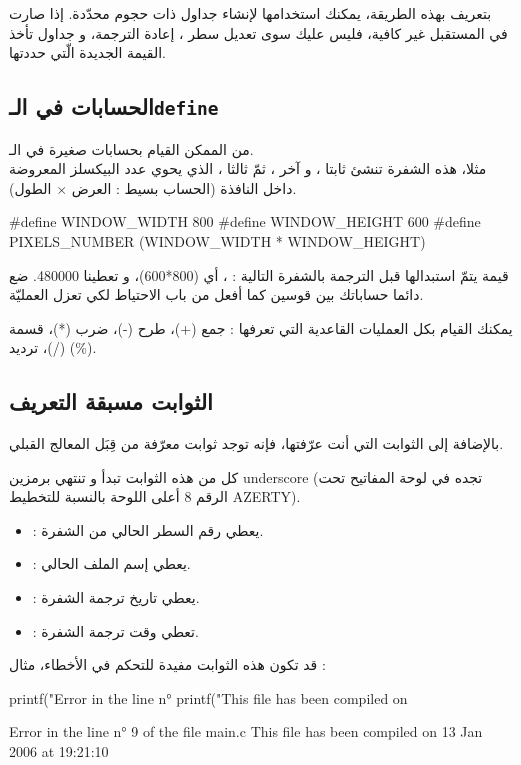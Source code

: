 بتعريف
بهذه الطريقة، يمكنك استخدامها لإنشاء جداول ذات حجوم محدّدة. إذا صارت في المستقبل غير كافية، فليس عليك سوى تعديل سطر
،
إعادة الترجمة، و جداول
تأخذ القيمة الجديدة الّتي حددتها.

\subsection{الحسابات في الـ\texttt{define}}
من الممكن القيام بحسابات صغيرة في الـ.\\
مثلا، هذه الشفرة تنشئ ثابتا
،
و آخر
،
ثمّ ثالثا
،
الذي يحوي عدد البيكسلز المعروضة داخل النافذة (الحساب بسيط : العرض $\times$ الطول).
\begin{Csource}
#define WINDOW_WIDTH 800
#define WINDOW_HEIGHT 600
#define PIXELS_NUMBER (WINDOW_WIDTH * WINDOW_HEIGHT)
\end{Csource}
قيمة
يتمّ استبدالها قبل الترجمة بالشفرة التالية :
،
أي (800*600)، و تعطينا 480000.
ضع دائما حساباتك بين قوسين كما أفعل من باب الاحتياط لكي تعزل العمليّة.

يمكنك القيام بكل العمليات القاعدية التي تعرفها : جمع (+)، طرح (-)، ضرب (*)، قسمة (/)، ترديد (\%).

\subsection{الثوابت مسبقة التعريف}
بالإضافة إلى الثوابت التي أنت عرّفتها، فإنه توجد ثوابت معرّفة من قِبَل المعالج القبلي.

كل من هذه الثوابت تبدأ و تنتهي برمزين
\textenglish{underscore} \InlineCode{\_}
(تجده في لوحة المفاتيح تحت الرقم 8 أعلى اللوحة بالنسبة للتخطيط
\textenglish{AZERTY}).
\begin{itemize}
  \item {} : يعطي رقم السطر الحالي من الشفرة.
  \item {} : يعطي إسم الملف الحالي.
  \item {} : يعطي تاريخ ترجمة الشفرة.
  \item {} : تعطي وقت ترجمة الشفرة.
\end{itemize}
قد تكون هذه الثوابت مفيدة للتحكم في الأخطاء، مثال :
\begin{Csource}
printf("Error in the line n° %
printf("This file has been compiled on %
\end{Csource}
\begin{Console}
Error in the line n° 9 of the file main.c
This file has been compiled on 13 Jan 2006 at 19:21:10
\end{Console}
